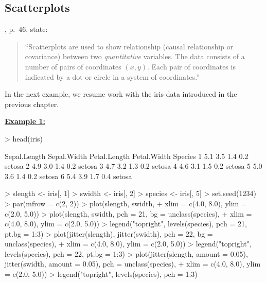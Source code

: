 \documentclass[12pt,letterpaper,final]{article}
\begin{document}
\subsection{Scatterplots}

\cite{WWPJH96}, p.~46, state: 
\begin{quotation}
``Scatterplots are used to show relationship (causal relationship or covariance)
between two {\it quantitative} variables. The data consists of a number of pairs
of coordinates $(x, y)$. Each pair of coordinates is indicated by a dot or circle
in a system of coordinates.''
\end{quotation}


In the next example, we resume work with 
the iris data introduced in the previous chapter.


\underline{\bf Example 1:}
%
\begin{Schunk}
\begin{Sinput}
> head(iris)
\end{Sinput}
\begin{Soutput}
  Sepal.Length Sepal.Width Petal.Length Petal.Width Species
1          5.1         3.5          1.4         0.2  setosa
2          4.9         3.0          1.4         0.2  setosa
3          4.7         3.2          1.3         0.2  setosa
4          4.6         3.1          1.5         0.2  setosa
5          5.0         3.6          1.4         0.2  setosa
6          5.4         3.9          1.7         0.4  setosa
\end{Soutput}
\begin{Sinput}
> slength <- iris[, 1]
> swidth <- iris[, 2]
> species <- iris[, 5]
> set.seed(1234)
> par(mfrow = c(2, 2))
> plot(slength, swidth,
+   xlim = c(4.0, 8.0), ylim = c(2.0, 5.0))
> plot(slength, swidth, pch = 21, bg = unclass(species),
+   xlim = c(4.0, 8.0), ylim = c(2.0, 5.0))
> legend("topright", levels(species), pch = 21, pt.bg = 1:3)
> plot(jitter(slength), jitter(swidth), pch = 22, bg = unclass(species),
+   xlim = c(4.0, 8.0), ylim = c(2.0, 5.0))
> legend("topright", levels(species), pch = 22, pt.bg = 1:3)
> plot(jitter(slength, amount = 0.05), jitter(swidth, amount = 0.05), pch = unclass(species),
+   xlim = c(4.0, 8.0), ylim = c(2.0, 5.0))
> legend("topright", levels(species), pch = 1:3)
\end{Sinput}
\end{Schunk}
\end{document}

